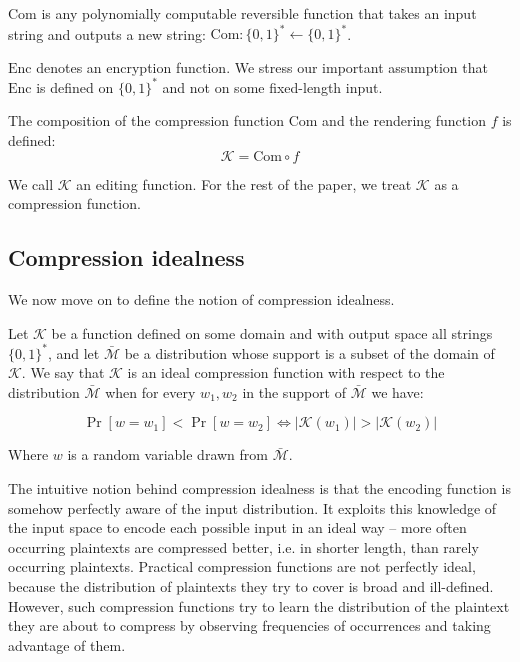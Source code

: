 \documentclass[conference, letterpaper, 10pt]{IEEEtran}
\begin{document}
$\textrm{Com}$ is any polynomially computable reversible function that takes an
input string and outputs a new string: $\textrm{Com}: \{0, 1\}^* \leftarrow \{0,
1\}^*$.

$\textrm{Enc}$ denotes an encryption function. We stress our important
assumption that $\textrm{Enc}$ is defined on $\{0, 1\}^*$ and not on some
fixed-length input.

The composition of the compression function $\textrm{Com}$ and the rendering function $f$
is defined:
\begin{equation*}
    \mathcal{K} = \textrm{Com} \circ f
\end{equation*}

We call $\mathcal{K}$ an editing function. For the rest of the paper, we treat
$\mathcal{K}$ as a compression function.

\subsection{Compression idealness}\label{subsec:com_idealness}

We now move on to define the notion of compression idealness.

Let $\mathcal{K}$ be a function defined on some domain and with output space
all strings $\{0, 1\}^*$, and let $\bar{\mathcal{M}}$ be a distribution whose
support is a subset of the domain of $\mathcal{K}$.  We say that $\mathcal{K}$
is an ideal compression function with respect to the distribution
$\bar{\mathcal{M}}$ when for every $w_1, w_2$ in the support of
$\bar{\mathcal{M}}$ we have:

\begin{equation*}
\Pr[w = w_1] < \Pr[w = w_2] \iff \lvert\mathcal{K}(w_1)\rvert > \lvert\mathcal{K}(w_2)\rvert
\end{equation*}

Where $w$ is a random variable drawn from $\bar{\mathcal{M}}$.

The intuitive notion behind compression idealness is that the encoding
function is somehow perfectly aware of the input distribution. It
exploits this knowledge of the input space to encode each possible
input in an ideal way – more often occurring plaintexts are compressed
better, i.e. in shorter length, than rarely occurring plaintexts.
Practical compression functions are not perfectly ideal, because the
distribution of plaintexts they try to cover is broad and ill-defined.
However, such compression functions try to learn the distribution of
the plaintext they are about to compress by observing frequencies of
occurrences and taking advantage of them.
\end{document}
